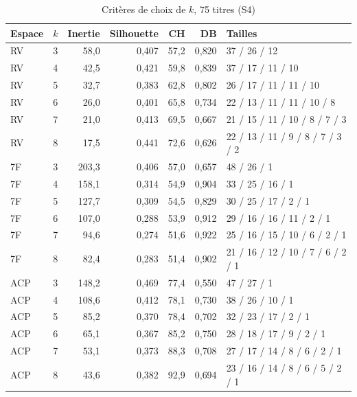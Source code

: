 \begin{table}[H]\centering\small
\caption{Critères de choix de $k$, 75 titres (S4)}\label{tab:annexe-k75}
\begin{tabular}{llrrrrl}\toprule
Espace & $k$ & Inertie & Silhouette & CH & DB & Tailles \\ \midrule
RV & 3 & 58{,}0 & 0{,}407 & 57{,}2 & 0{,}820 & 37 / 26 / 12 \\
RV & 4 & 42{,}5 & 0{,}421 & 59{,}8 & 0{,}839 & 37 / 17 / 11 / 10 \\
RV & 5 & 32{,}7 & 0{,}383 & 62{,}8 & 0{,}802 & 26 / 17 / 11 / 11 / 10 \\
RV & 6 & 26{,}0 & 0{,}401 & 65{,}8 & 0{,}734 & 22 / 13 / 11 / 11 / 10 / 8 \\
RV & 7 & 21{,}0 & 0{,}413 & 69{,}5 & 0{,}667 & 21 / 15 / 11 / 10 / 8 / 7 / 3 \\
RV & 8 & 17{,}5 & 0{,}441 & 72{,}6 & 0{,}626 & 22 / 13 / 11 / 9 / 8 / 7 / 3 / 2 \\
\midrule
7F & 3 & 203{,}3 & 0{,}406 & 57{,}0 & 0{,}657 & 48 / 26 / 1 \\
7F & 4 & 158{,}1 & 0{,}314 & 54{,}9 & 0{,}904 & 33 / 25 / 16 / 1 \\
7F & 5 & 127{,}7 & 0{,}309 & 54{,}5 & 0{,}829 & 30 / 25 / 17 / 2 / 1 \\
7F & 6 & 107{,}0 & 0{,}288 & 53{,}9 & 0{,}912 & 29 / 16 / 16 / 11 / 2 / 1 \\
7F & 7 & 94{,}6 & 0{,}274 & 51{,}6 & 0{,}922 & 25 / 16 / 15 / 10 / 6 / 2 / 1 \\
7F & 8 & 82{,}4 & 0{,}283 & 51{,}4 & 0{,}902 & 21 / 16 / 12 / 10 / 7 / 6 / 2 / 1 \\
\midrule
ACP & 3 & 148{,}2 & 0{,}469 & 77{,}4 & 0{,}550 & 47 / 27 / 1 \\
ACP & 4 & 108{,}6 & 0{,}412 & 78{,}1 & 0{,}730 & 38 / 26 / 10 / 1 \\
ACP & 5 & 85{,}2 & 0{,}370 & 78{,}4 & 0{,}702 & 32 / 23 / 17 / 2 / 1 \\
ACP & 6 & 65{,}1 & 0{,}367 & 85{,}2 & 0{,}750 & 28 / 18 / 17 / 9 / 2 / 1 \\
ACP & 7 & 53{,}1 & 0{,}373 & 88{,}3 & 0{,}708 & 27 / 17 / 14 / 8 / 6 / 2 / 1 \\
ACP & 8 & 43{,}6 & 0{,}382 & 92{,}9 & 0{,}694 & 23 / 16 / 14 / 8 / 6 / 5 / 2 / 1 \\
\bottomrule\end{tabular}\end{table}
